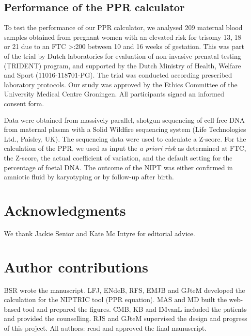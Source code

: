 \subsection{Performance of the PPR calculator}
To test the performance of our PPR calculator, we analysed 209 maternal blood samples obtained from pregnant women with an elevated risk for trisomy 13, 18 or 21 due to an FTC \textgreater{}:200 between 10 and 16 weeks of gestation. 
This was part of the trial by Dutch laboratories for evaluation of non-invasive prenatal testing (TRIDENT) program, and supported by the Dutch Ministry of Health, Welfare and Sport (11016-118701-PG). 
The trial was conducted according prescribed laboratory protocols. 
Our study was approved by the Ethics Committee of the University Medical Centre Groningen. 
All participants signed an informed consent form.

Data were obtained from massively parallel, shotgun sequencing of cell-free DNA from maternal plasma with a Solid Wildfire sequencing system (Life Technologies Ltd., Paisley, UK). 
The sequencing data were used to calculate a Z-score. 
For the calculation of the PPR, we used as input the \textsl{a priori risk} as determined at FTC, the Z-score, the actual coefficient of variation, and the default setting for the percentage of foetal DNA. 
The outcome of the NIPT was either confirmed in amniotic fluid by karyotyping or by follow-up after birth.

\section*{Acknowledgments}\label{Acknowledgments} 
We thank Jackie Senior and Kate Mc Intyre for editorial advice.

\section*{Author contributions}
BSR wrote the manuscript. LFJ, ENdeB, RFS, EMJB and GJteM developed the calculation for the NIPTRIC tool (PPR equation). MAS and MD built the web-based tool and prepared the figures. CMB, KB and IMvanL included the patients and provided the counselling. RJS and GJteM supervised the design and progress of this project. All authors: read and approved the final manuscript.
